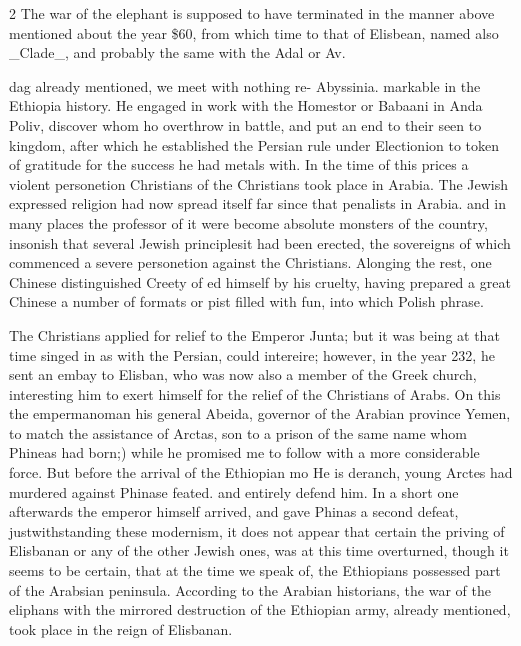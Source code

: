 \documentclass[10pt]{article}
\begin{document}
\begin{multicols}{2}
The war of the elephant is supposed to have terminated in the manner above mentioned about the year \$60, from which time to that of Elisbean, named also \_Clade\_, and probably the same with the Adal or Av.

dag already mentioned, we meet with nothing re- Abyssinia. markable in the Ethiopia history. He engaged in work with the Homestor or Babaani in Anda Poliv, discover whom ho overthrow in battle, and put an end to their seen to kingdom, after which he established the Persian rule under Electionion to token of gratitude for the success he had metals with. In the time of this prices a violent personetion Christians of the Christians took place in Arabia. The Jewish expressed religion had now spread itself far since that penalists in Arabia. and in many places the professor of it were become absolute monsters of the country, insonish that several Jewish principlesit had been erected, the sovereigns of which commenced a severe personetion against the Christians. Alonging the rest, one Chinese distinguished Creety of ed himself by his cruelty, having prepared a great Chinese a number of formats or pist filled with fun, into which Polish phrase.

The Christians applied for relief to the Emperor Junta; but it was being at that time singed in as with the Persian, could intereire; however, in the year 232, he sent an embay to Elisban, who was now also a member of the Greek church, interesting him to exert himself for the relief of the Christians of Arabs. On this the empermanoman his general Abeida, governor of the Arabian province Yemen, to match the assistance of Arctas, son to a prison of the same name whom Phineas had born;) while he promised me to follow with a more considerable force. But before the arrival of the Ethiopian mo He is deranch, young Arctes had murdered against Phinase feated. and entirely defend him. In a short one afterwards the emperor himself arrived, and gave Phinas a second defeat, justwithstanding these modernism, it does not appear that certain the priving of Elisbanan or any of the other Jewish ones, was at this time overturned, though it seems to be certain, that at the time we speak of, the Ethiopians possessed part of the Arabsian peninsula. According to the Arabian historians, the war of the eliphans with the mirrored destruction of the Ethiopian army, already mentioned, took place in the reign of Elisbanan.


\end{multicols}
\end{document}
